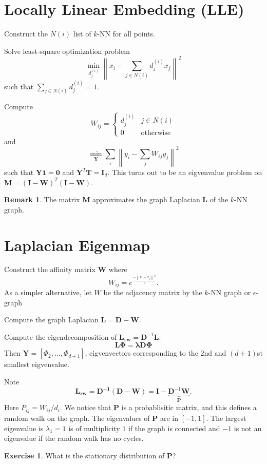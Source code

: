 \documentclass[11pt]{article}
\newcommand{\norm}[1]{\left\lVert#1\right\rVert}
\theoremstyle{definition}
\newtheorem{remark}{Remark}
\newtheorem{exercise}{Exercise}
\begin{document}
\section{Locally Linear Embedding (LLE)} 
\begin{steps}
    \item Construct the $N(i)$ list of $k$-NN for all points.
    \item Solve least-square optimization problem
        \[
            \min _{d_j^{(i)}} \norm{x_i- \sum_{j\in N(i)} d_j^{(i)} x_j}^2
        \]
        such that $\sum_{j\in N(i)} d_j^{(i)} =1$.
    \item Compute 
        \[
            W_{ij} = \begin{cases}
                d_j^{(i)} & j\in N(i)\\
                0 & \text{otherwise}
            \end{cases}
        \]
        and 
    \[
        \min _{\bm{Y}} \sum_{i} \norm{y_i -\sum_j W_{ij}y_j}^2
    \]
    such that $\bm{Y}\bm{1}=\bm{0}$ and $\bm{Y}^T\bm{T}=\bm{I}_d$. This turns out to be an eigvenvalue problem on $\bm{M}=(\bm{I}-\bm{W})^T(\bm{I}-\bm{W})$.
\end{steps}
\begin{remark}
    The matrix $\bm{M}$ approximates the graph Laplacian $\bm{L}$ of the $k$-NN graph.
\end{remark}

\section{Laplacian Eigenmap}
\begin{steps}
\item Construct the affinity matrix $\bm{W}$ where 
    \[ 
    W_{ij} = e^{\frac{-\norm{x_i-x_j}^2}{\epsilon}}.
    \]
    As a simpler alternative, let $W$ be the adjacency matrix by the $k$-NN graph or $\epsilon$-graph
\item Compute the graph Laplacian $\bm{L} = \mathbf{D} - \bm{W}$.
\item Compute the eigendecomposition of $\bm{L_{rw}} = \bm{D}^{-1}\bm{L}$:
    \[
        \bm{L\Phi} =\bm{\lambda D \Phi}
    \]
    Then $\mathbf{Y} = [\Phi_2, \ldots, \Phi_{d+1}]$, eigvenvectors corresponding to the $2$nd and $(d+1)$st smallest eigvenvalue.
    \end{steps}
Note 
    \[
        \mathbf{L_{rw} = \bm{D}^{-1} (\bm{D}-\bm{W})} = \bm{I} - \underbrace{\bm{D}^{-1}\bm{W}}_{\bm{P}}.
    \]
    Here $P_{ij}= W_{ij} / d_i$.  We notice that $\mathbf{P}$ is a probablisitic matrix, and this defines a random walk on the graph. The eigenvalues of $\bm{P}$ are in $[-1,1]$. The largest eigenvalue is $\lambda_1 =1$ is of multiplicity $1$ if the graph is connected and $-1$ is not an eigenvalue if the random walk has no cycles.
\begin{exercise}
    What is the stationary distribution of $\bm{P}$?
\end{exercise}



\end{document}
